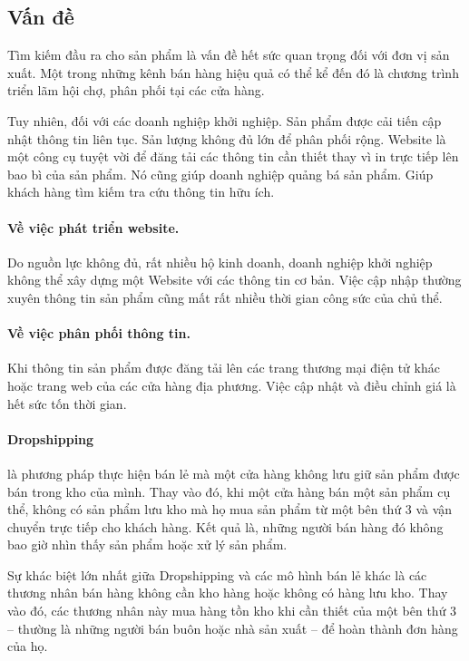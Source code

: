 \documentclass[11pt]{report}
\begin{document}
\subsection*{Vấn đề}
Tìm kiếm đầu ra cho sản phẩm là vấn đề hết sức quan trọng đối với đơn vị sản xuất. Một trong những kênh bán hàng hiệu quả có thể kể đến đó là chương trình triển lãm hội chợ, phân phối tại các cửa hàng.

Tuy nhiên, đối với các doanh nghiệp khởi nghiệp. Sản phẩm được cải tiến cập nhật thông tin liên tục. Sản lượng không đủ lớn để phân phối rộng. Website là một công cụ tuyệt vời để đăng tải các thông tin cần thiết thay vì in trực tiếp lên bao bì của sản phẩm. Nó cũng giúp doanh nghiệp quảng bá sản phẩm. Giúp khách hàng tìm kiếm tra cứu thông tin hữu ích.

\paragraph{Về việc phát triển website.}\label{pro:1} Do nguồn lực không đủ, rất nhiều hộ kinh doanh, doanh nghiệp khởi nghiệp không thể xây dựng một Website với các thông tin cơ bản. Việc cập nhập thường xuyên thông tin sản phẩm cũng mất rất nhiều thời gian công sức của chủ thể.

\paragraph{Về việc phân phối thông tin.}\label{pro:2} Khi thông tin sản phẩm được đăng tải  lên các trang thương mại điện tử khác hoặc trang web của các cửa hàng địa phương. Việc cập nhật và điều chỉnh giá là hết sức tốn thời gian.

\paragraph{Dropshipping} là phương pháp thực hiện bán lẻ mà một cửa hàng không lưu giữ sản phẩm được bán trong kho của mình. Thay vào đó, khi một cửa hàng bán một sản phẩm cụ thể, không có sản phẩm lưu kho mà họ mua sản phẩm từ một bên thứ 3 và vận chuyển trực tiếp cho khách hàng. Kết quả là, những người bán hàng đó không bao giờ nhìn thấy sản phẩm hoặc xử lý sản phẩm.

Sự khác biệt lớn nhất giữa Dropshipping và các mô hình bán lẻ khác là các thương nhân bán hàng không cần kho hàng hoặc không có hàng lưu kho. Thay vào đó, các thương nhân này mua hàng tồn kho khi cần thiết của một bên thứ 3 – thường là những người bán buôn hoặc nhà sản xuất – để hoàn thành đơn hàng của họ.
\end{document}

